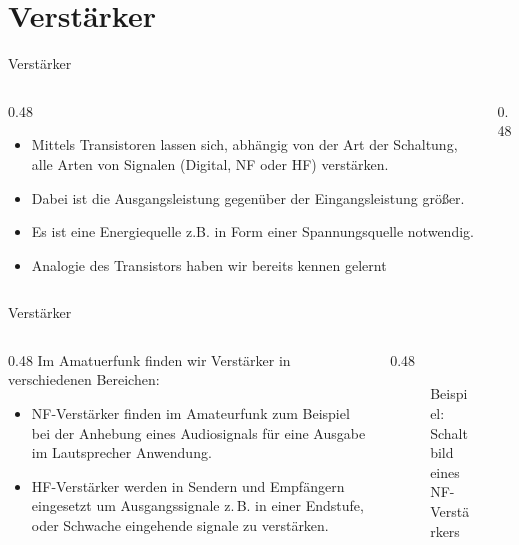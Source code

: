 
\section{Verstärker}
\label{section:verstaerker}
\begin{frame}{Verstärker}
    \begin{columns}
        \begin{column}{0.48\linewidth}
            \begin{itemize}
                \item Mittels Transistoren lassen sich, abhängig von der Art der Schaltung, alle Arten von Signalen (Digital, NF oder HF) verstärken.
                \item Dabei ist die Ausgangsleistung gegenüber der Eingangsleistung größer.
                \item Es ist eine Energiequelle z.B. in Form einer Spannungsquelle notwendig.
                \item Analogie des Transistors haben wir bereits kennen gelernt
            \end{itemize}
        \end{column}
        \begin{column}{0.48\linewidth}
        \end{column}
    \end{columns}
\end{frame}

\begin{frame}{Verstärker}
    \begin{columns}
        \begin{column}{0.48\textwidth}
            Im Amatuerfunk finden wir Verstärker in verschiedenen Bereichen:
            \begin{itemize}
                \item NF-Verstärker finden im Amateurfunk zum Beispiel bei der
                Anhebung eines Audiosignals für eine Ausgabe im Lautsprecher
                Anwendung.
                \item HF-Verstärker werden in Sendern und Empfängern eingesetzt
                um Ausgangssignale z.\,B. in einer Endstufe, oder Schwache
                eingehende signale zu verstärken.
            \end{itemize}
        \end{column}
        \begin{column}{0.48\textwidth}
            \begin{figure}
                \caption{\scriptsize Beispiel: Schaltbild eines NF-Verstärkers}
                \label{e_nf_verstaerker}
            \end{figure}
       \end{column}
    \end{columns}
\end{frame}

